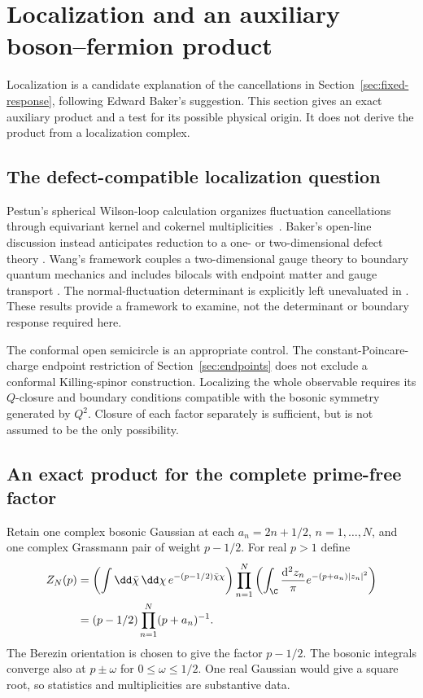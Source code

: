 \section{Localization and an auxiliary boson--fermion product}
\label{sec:localization}

Localization is a candidate explanation of the cancellations
in Section~\ref{sec:fixed-response}, following Edward Baker's
suggestion. This section gives an exact auxiliary product
and a test for its possible physical origin. It does not
derive the product from a localization complex.

\subsection{The defect-compatible localization question}

Pestun's spherical Wilson-loop calculation organizes
fluctuation cancellations through equivariant kernel and
cokernel multiplicities~\cite[Section~4]{Pestun}.
Baker's open-line discussion instead anticipates reduction
to a one- or two-dimensional defect theory
\cite[Section~3.3]{Baker}. Wang's framework couples a
two-dimensional gauge theory to boundary quantum mechanics
and includes bilocals with endpoint matter and gauge
transport \cite[Section~5.1, equation~(5.5)]{WangDefects}.
The normal-fluctuation determinant is explicitly left
unevaluated in \cite[Section~4.4]{WangDefects}. These results
provide a framework to examine, not the determinant or
boundary response required here.

The conformal open semicircle is an appropriate control.
The constant-Poincare-charge endpoint restriction of
Section~\ref{sec:endpoints} does not exclude a conformal
Killing-spinor construction. Localizing the whole observable
requires its $Q$-closure and boundary conditions compatible
with the bosonic symmetry generated by $Q^2$. Closure of
each factor separately is sufficient, but is not assumed
to be the only possibility.

\subsection{An exact product for the complete prime-free factor}
\label{subsec:bf-product}

Retain one complex bosonic Gaussian at each
$a_n=2n+1/2$, $n=1,\ldots,N$, and one complex Grassmann pair
of weight $p-1/2$. For real $p>1$ define
\begin{align}\label{eq:bf-gaussian}
 Z_N(p)
 &=
 \left(\int\dd\bar\chi\,\dd\chi\,
 e^{-(p-1/2)\bar\chi\chi}\right)
 \prod_{n=1}^N\left(\int_\C\frac{\mathrm d^2z_n}{\pi}
 e^{-(p+a_n)|z_n|^2}\right)\notag\\
 &=(p-1/2)\prod_{n=1}^N(p+a_n)^{-1}.
\end{align}
The Berezin orientation is chosen to give the factor
$p-1/2$. The bosonic integrals converge also at
$p\pm\omega$ for $0\le\omega\le1/2$. One real Gaussian
would give a square root, so statistics and multiplicities
are substantive data.

